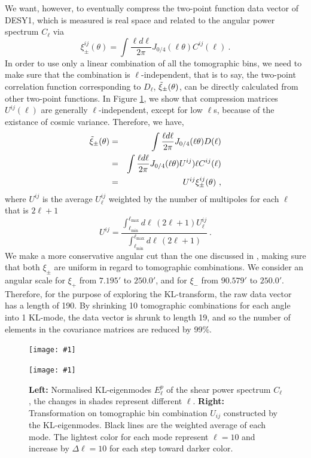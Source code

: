 \documentclass[twocolumn]{\docclass}
\newcommand{\sfig}[2]{
	\texttt{[image: \#1]}
}
\newcommand{\rf}[1]{Figure \ref{fig:#1}}
\newcommand\be{\begin{equation}}
\newcommand\ee{\end{equation}}
\def\bea{\begin{eqnarray}}
\def\eea{\end{eqnarray}}
\begin{document}
	We want, however, to eventually compress the two-point function data vector of DESY1, which is measured is real space and related to the angular power spectrum $C_{\ell}$ via
	\begin{equation*}
	\xi_{\pm}^{ij}(\theta) = \int \frac{\ell d \ell }{2\pi}J_{0/4}(\ell \theta) C^{ij}(\ell)\ 
	.\end{equation*}
	In order to use only a linear combination of all the tomographic bins, we need to make sure that the combination is $\ell$-independent, that is to say, the two-point correlation function corresponding to $D_{\ell}$, $\Tilde{\xi}_{\pm}(\theta)$, can be directly calculated from other two-point functions. In \rf{kl-mode}, we show that compression matrices $U^{ij}(\ell)$ are generally $\ell$-independent, except for low $\ell$s, because of the existance of cosmic variance. Therefore, we have, 
	\bea
	\nonumber\Tilde{\xi}_{\pm}(\theta) &=& \int \frac{\ell d \ell }{2\pi}J_{0/4}(\ell \theta) D(\ell)\\\nonumber
	&=&\int \frac{\ell d \ell }{2\pi}J_{0/4}(\ell \theta) U^{ij})\ell C^{ij}(\ell)\\
	&=&U^{ij}\xi_{\pm}^{ij}(\theta)\
	,\eea
	where $U^{ij}$ is the average $U^{ij}_{\ell}$ weighted by the number of multipoles for each $\ell$ that is $2\ell+1$
	\be
	U^{ij} = \frac{\int_{\ell _{\mathrm{min}}}^{\ell _{\mathrm{max}}} d\ell\, (2 \ell +1) U^{ij}_{\ell}}{\int_{\ell _{\mathrm{min}}}^{\ell _{\mathrm{max}}} d\ell\, (2 \ell +1)}\
	.\ee
	We make a more conservative angular cut than the one discussed in \cite{Troxel:2017xyo}, making sure that both $\xi_{\pm}$ are uniform in regard to tomographic combinations. We consider an angular scale for  $\xi_+$ from $7.195'$ to $250.0'$, and for $\xi_-$ from $90.579'$ to $250.0'$. Therefore, for the purpose of exploring the KL-transform, the raw data vector has a length of 190. By shrinking 10 tomographic combinations for each angle into 1 KL-mode, the data vector is shrunk to length 19, and so the number of elements in the covariance matrices are reduced by 99\%.
	
	\begin{figure}[thbp]
	    \sfig{figures/epi.png}{0.8\columnwidth}
	    \sfig{figures/Wij.png}{1.02\columnwidth}
		\caption{\textbf{Left:} Normalised KL-eigenmodes $E_\ell^p$ of the shear power spectrum $C_{\ell}$, the changes in shades represent different $\ell$. \textbf{Right:} Transformation on tomographic bin combination $U_{ij}$ constructed by the KL-eigenmodes. Black lines are the weighted average of each mode. The lightest color for each mode represent $\ell = 10$ and increase by $\Delta \ell = 10$ for each step toward darker color. \label{fig:kl-mode}}
	\end{figure}
	
\end{document}
